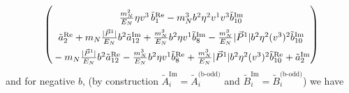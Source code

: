 \documentclass[]{article}
\numberwithin{equation}{section}
\newcommand{\bvec}{b}
\newcommand{\mN}{m_N}
\begin{document}
\begin{align}
\begin{pmatrix}
      \rule{0pt}{16pt} \frac{\mN^2}{E_N} \eta v^3\, \tilde b^{\text{Re}}_1 -\mN^3 \bvec^2 \eta^2 v^1 v^3\tilde b^{\text{Im}}_{10}\\
      \rule{0pt}{16pt}  \tilde a^{\text{Re}}_2 +  \mN  \frac{|\vec{P}^1|}{E_N} \bvec^2  \tilde a^{\text{Im}}_{12}+ \frac{  \mN^3}{E_N}  \bvec^2 \eta v^1  \tilde b^{\text{Im}}_8- \frac{ \mN^3}{E_N}  |\vec{P}^1| \bvec^2 \eta^2 (v^3)^2 \tilde b^{\text{Im}}_{10}\\
      \rule{0pt}{16pt} -  \mN  \frac{|\vec{P}^1|}{E_N} \bvec^2  \tilde a^{\text{Re}}_{12}- \frac{  \mN^3}{E_N}  \bvec^2 \eta v^1  \tilde b^{\text{Re}}_8+ \frac{ \mN^3}{E_N}  |\vec{P}^1| \bvec^2 \eta^2 (v^3)^2 \tilde b^{\text{Re}}_{10}+\tilde a^{\text{Im}}_2
    \end{pmatrix}
\end{align}
and for negative $b$, (by construction $ \tilde{A}^{\text{Im}}_i=\tilde{A}^{\text{(b-odd})}_i$ and  $\tilde{B}^{\text{Im}}_i=\tilde{B}^{\text{(b-odd})}_i$) we have 
\end{document}
